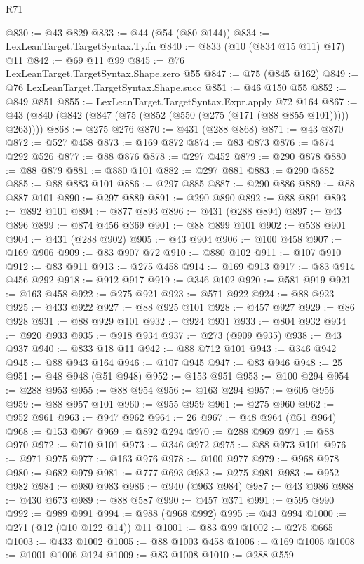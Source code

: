 \begin{lexlean}{R71}
\begin{coremodule}
@830 := @43 @829
@833 := @44 (@54 (@80 @144))
@834 := LexLeanTarget.TargetSyntax.Ty.fn
@840 := @833 (@10 (@834 @15 @11) @17) @11
@842 := @69 @11 @99
@845 := @76 LexLeanTarget.TargetSyntax.Shape.zero @55
@847 := @75 (@845 @162)
@849 := @76 LexLeanTarget.TargetSyntax.Shape.succ
@851 := @46 @150 @55
@852 := @849 @851
@855 := LexLeanTarget.TargetSyntax.Expr.apply @72 @164
@867 := @43 (@840 (@842 (@847 (@75 (@852 (@550 (@275 (@171 (@88 @855 @101))))) @263))))
@868 := @275 @276
@870 := @431 (@288 @868)
@871 := @43 @870
@872 := @527 @458
@873 := @169 @872
@874 := @83 @873
@876 := @874 @292 @526
@877 := @88 @876
@878 := @297 @452
@879 := @290 @878
@880 := @88 @879
@881 := @880 @101
@882 := @297 @881
@883 := @290 @882
@885 := @88 @883 @101
@886 := @297 @885
@887 := @290 @886
@889 := @88 @887 @101
@890 := @297 @889
@891 := @290 @890
@892 := @88 @891
@893 := @892 @101
@894 := @877 @893
@896 := @431 (@288 @894)
@897 := @43 @896
@899 := @874 @456 @369
@901 := @88 @899 @101
@902 := @538 @901
@904 := @431 (@288 @902)
@905 := @43 @904
@906 := @100 @458
@907 := @169 @906
@909 := @83 @907 @72
@910 := @880 @102
@911 := @107 @910
@912 := @83 @911
@913 := @275 @458
@914 := @169 @913
@917 := @83 @914 @456 @292
@918 := @912 @917
@919 := @346 @102
@920 := @581 @919
@921 := @163 @458
@922 := @275 @921
@923 := @571 @922
@924 := @88 @923
@925 := @433 @922
@927 := @88 @925 @101
@928 := @457 @927
@929 := @86 @928
@931 := @88 @929 @101
@932 := @924 @931
@933 := @804 @932
@934 := @920 @933
@935 := @918 @934
@937 := @273 (@909 @935)
@938 := @43 @937
@940 := @833 @18 @11
@942 := @88 @712 @101
@943 := @346 @942
@945 := @88 @943 @164
@946 := @107 @945
@947 := @83 @946
@948 := 25
@951 := @48 @948 (@51 @948)
@952 := @153 @951
@953 := @100 @294
@954 := @288 @953
@955 := @88 @954
@956 := @163 @294
@957 := @605 @956
@959 := @88 @957 @101
@960 := @955 @959
@961 := @275 @960
@962 := @952 @961
@963 := @947 @962
@964 := 26
@967 := @48 @964 (@51 @964)
@968 := @153 @967
@969 := @892 @294
@970 := @288 @969
@971 := @88 @970
@972 := @710 @101
@973 := @346 @972
@975 := @88 @973 @101
@976 := @971 @975
@977 := @163 @976
@978 := @100 @977
@979 := @968 @978
@980 := @682 @979
@981 := @777 @693
@982 := @275 @981
@983 := @952 @982
@984 := @980 @983
@986 := @940 (@963 @984)
@987 := @43 @986
@988 := @430 @673
@989 := @88 @587
@990 := @457 @371
@991 := @595 @990
@992 := @989 @991
@994 := @988 (@968 @992)
@995 := @43 @994
@1000 := @271 (@12 (@10 @122 @14)) @11
@1001 := @83 @99
@1002 := @275 @665
@1003 := @433 @1002
@1005 := @88 @1003 @458
@1006 := @169 @1005
@1008 := @1001 @1006 @124
@1009 := @83 @1008
@1010 := @288 @559

\end{coremodule}
\end{lexlean}

